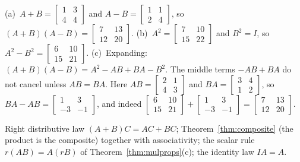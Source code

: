 \documentclass[11pt]{article}
\begin{document}
\begin{description}[leftmargin=0pt,itemsep=5pt]
  \item[Knowledge Check \ref{kc:expand}.] (a)~$A+B=\begin{bmatrix}1&3\\4&4\end{bmatrix}$ and $A-B=\begin{bmatrix}1&1\\2&4\end{bmatrix}$, so $(A+B)(A-B)=\begin{bmatrix}7&13\\12&20\end{bmatrix}$. (b)~$A^2=\begin{bmatrix}7&10\\15&22\end{bmatrix}$ and $B^2=I$, so $A^2-B^2=\begin{bmatrix}6&10\\15&21\end{bmatrix}$. (c)~Expanding: $(A+B)(A-B)=A^2-AB+BA-B^2$. The middle terms $-AB+BA$ do not cancel unless $AB=BA$. Here $AB=\begin{bmatrix}2&1\\4&3\end{bmatrix}$ and $BA=\begin{bmatrix}3&4\\1&2\end{bmatrix}$, so $BA-AB=\begin{bmatrix}1&3\\-3&-1\end{bmatrix}$, and indeed $\begin{bmatrix}6&10\\15&21\end{bmatrix}+\begin{bmatrix}1&3\\-3&-1\end{bmatrix}=\begin{bmatrix}7&13\\12&20\end{bmatrix}$.
  \item[Knowledge Check \ref{kc:whichlaw}.] Right distributive law $(A+B)C=AC+BC$; Theorem~\ref{thm:composite} (the product is the composite) together with associativity; the scalar rule $r(AB)=A(rB)$ of Theorem~\ref{thm:mulprops}(c); the identity law $IA=A$.

\end{description}
\end{document}
